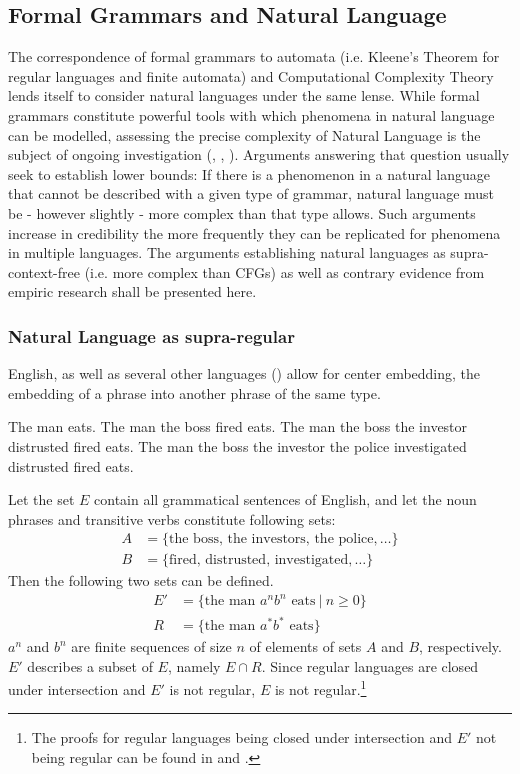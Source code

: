 \subsection{Formal Grammars and Natural Language}
The correspondence of formal grammars to automata (i.e. Kleene's Theorem for regular languages and finite automata) and Computational Complexity Theory lends itself to consider natural languages under the same lense. While formal grammars constitute powerful tools with which phenomena in natural language can be modelled, assessing the precise complexity of Natural Language is the subject of ongoing investigation (\cite{Fitch2012}, \cite{Petersson2012}, \cite{Newmeyer2014}).
Arguments answering that question usually seek to establish lower bounds: If there is a phenomenon in a natural language that cannot be described with a given type of grammar, natural language must be - however slightly - more complex than that type allows. Such arguments increase in credibility the more frequently they can be replicated for phenomena in multiple languages. The arguments establishing natural languages as supra-context-free (i.e. more complex than CFGs) as well as contrary evidence from empiric research shall be presented here.

\subsubsection{Natural Language as supra-regular}\label{supraReg}
English, as well as several other languages (\cite{Hagege1976}) allow for center embedding, the embedding of a phrase into another phrase of the same type.
\begin{exe}
	\ex The man eats.
	\ex The man the boss fired eats.
	\ex The man the boss the investor distrusted fired eats.
	\ex The man the boss the investor the police investigated distrusted fired eats.
\end{exe}
Let the set $E$ contain all grammatical sentences of English, and let the noun phrases and transitive verbs constitute following sets:
\begin{align*}
A &= \lbrace \text{the boss}, \, \text{the investors}, \, \text{the police}, \dots \rbrace \\
B &= \lbrace \text{fired}, \, \text{distrusted}, \, \text{investigated}, \dots \rbrace
\end{align*}
Then the following two sets can be defined.
\begin{align*}
E' &= \lbrace \text{the man } a^{n}b^{n} \text{ eats} \: \vert \: n \geq 0 \rbrace \\
R &= \lbrace \text{the man } a^{*}b^{*} \text{ eats} \rbrace
\end{align*}
$a^{n}$ and $b^{n}$ are finite sequences of size $n$ of elements of sets $A$ and $B$, respectively. $E'$ describes a subset of $E$, namely $E \cap R$. Since regular languages are closed under intersection and $E'$ is not regular, $E$ is not regular.\footnote{The proofs for regular languages being closed under intersection and $E'$ not being regular can be found in \cite{Hopcroft2006} and \cite{Sipser2013}.}


